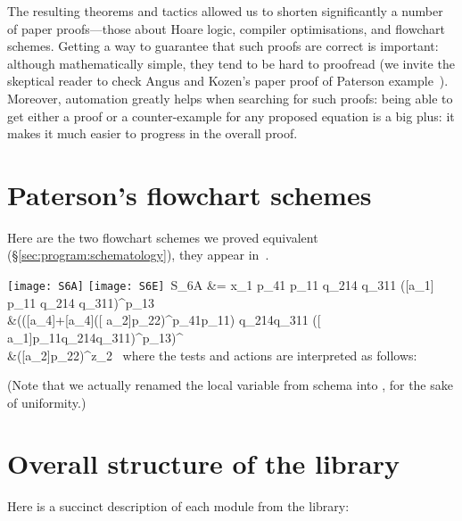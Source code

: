 \documentclass[a4paper]{llncs}
\begin{document}
The resulting theorems and tactics allowed us to shorten significantly
a number of paper proofs---those about Hoare logic, compiler
optimisations, and flowchart schemes. Getting a way to guarantee that
such proofs are correct is important: although mathematically simple,
they tend to be hard to proofread (we invite the skeptical reader to
check Angus and Kozen's paper proof of Paterson
example~\cite{angusk01:kat:schemato}).  Moreover, automation greatly
helps when searching for such proofs: being able to get either a proof
or a counter-example for any proposed equation is a big plus: it makes
it much easier to progress in the overall proof.




\clearpage
\appendix
\section{Paterson's flowchart schemes}
\label{app:paterson}

Here are the two flowchart schemes we proved equivalent
(§\ref{sec:program:schematology}), they appear
in~\cite[pages 254 and 258]{Manna74}.

\bigskip

\noindent
\texttt{[image: S6A]}
\hfill
\texttt{[image: S6E]}\
  S_{6A} &= x_1 p_{41} p_{11} q_{214} q_{311}
  \left([\neg a_{1}] p_{11} q_{214} q_{311}\right)^\star [a_{1}] p_{13} \\
  &\quad \left(\left([\neg a_{4}]+[a_{4}]([\neg
      a_{2}]p_{22})^p_{41}p_{11}\right)
    q_{214}q_{311} \left([\neg
      a_{1}]p_{11}q_{214}q_{311}\right)^\star[a_{1}]p_{13}\right)^\star\\
  &\quad [a_{4}]\left([\neg a_{2}]p_{22}\right)^\star[a_{2}\land a_{3}]z_{2} \
where the tests and actions are interpreted as follows:

(Note that we actually renamed the local variable  from schema
 into , for the sake of uniformity.)

\clearpage
\section{Overall structure of the library}
\label{app:structure}

Here is a succinct description of each module from the library:
\end{document}

